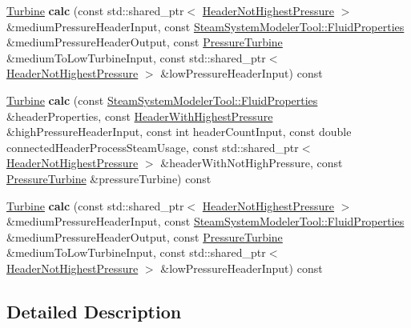 \begin{DoxyCompactItemize}
\item 
\mbox{\label{class_turbine_calculator_a7d5e42c0554f41015104c4837ce2f8fa}} 
\hyperlink{class_turbine}{Turbine} {\bfseries calc} (const std\+::shared\+\_\+ptr$<$ \hyperlink{class_header_not_highest_pressure}{Header\+Not\+Highest\+Pressure} $>$ \&medium\+Pressure\+Header\+Input, const \hyperlink{struct_steam_system_modeler_tool_1_1_fluid_properties}{Steam\+System\+Modeler\+Tool\+::\+Fluid\+Properties} \&medium\+Pressure\+Header\+Output, const \hyperlink{class_pressure_turbine}{Pressure\+Turbine} \&medium\+To\+Low\+Turbine\+Input, const std\+::shared\+\_\+ptr$<$ \hyperlink{class_header_not_highest_pressure}{Header\+Not\+Highest\+Pressure} $>$ \&low\+Pressure\+Header\+Input) const
\item 
\mbox{\label{class_turbine_calculator_a7904fce359c5ec124e13fe76afe6efa2}} 
\hyperlink{class_turbine}{Turbine} {\bfseries calc} (const \hyperlink{struct_steam_system_modeler_tool_1_1_fluid_properties}{Steam\+System\+Modeler\+Tool\+::\+Fluid\+Properties} \&header\+Properties, const \hyperlink{class_header_with_highest_pressure}{Header\+With\+Highest\+Pressure} \&high\+Pressure\+Header\+Input, const int header\+Count\+Input, const double connected\+Header\+Process\+Steam\+Usage, const std\+::shared\+\_\+ptr$<$ \hyperlink{class_header_not_highest_pressure}{Header\+Not\+Highest\+Pressure} $>$ \&header\+With\+Not\+High\+Pressure, const \hyperlink{class_pressure_turbine}{Pressure\+Turbine} \&pressure\+Turbine) const
\item 
\mbox{\label{class_turbine_calculator_a7d5e42c0554f41015104c4837ce2f8fa}} 
\hyperlink{class_turbine}{Turbine} {\bfseries calc} (const std\+::shared\+\_\+ptr$<$ \hyperlink{class_header_not_highest_pressure}{Header\+Not\+Highest\+Pressure} $>$ \&medium\+Pressure\+Header\+Input, const \hyperlink{struct_steam_system_modeler_tool_1_1_fluid_properties}{Steam\+System\+Modeler\+Tool\+::\+Fluid\+Properties} \&medium\+Pressure\+Header\+Output, const \hyperlink{class_pressure_turbine}{Pressure\+Turbine} \&medium\+To\+Low\+Turbine\+Input, const std\+::shared\+\_\+ptr$<$ \hyperlink{class_header_not_highest_pressure}{Header\+Not\+Highest\+Pressure} $>$ \&low\+Pressure\+Header\+Input) const
\end{DoxyCompactItemize}


\subsection{Detailed Description}


